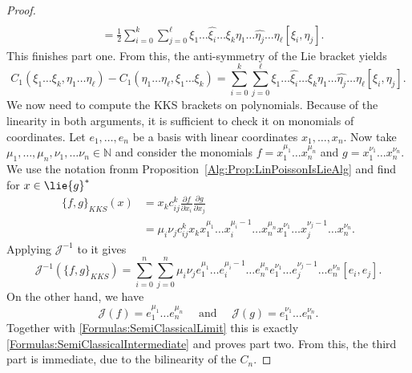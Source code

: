 \begin{proof}
\begin{align*}
		[\xi_{\sigma(k)}, \eta_{\tau(\ell)}]
		\\
		& =
		\frac{1}{2}
		\sum\limits_{i = 0}^k
		\sum\limits_{j = 0}^{\ell}
		\xi_1 \ldots \widehat{\xi_i} \ldots \xi_k
		\eta_1 \ldots \widehat{\eta_j} \ldots \eta_{\ell}
		[\xi_i, \eta_j].
	\end{align*}
	This finishes part one. From this, the anti-symmetry of the Lie bracket 
	yields
	\begin{equation*}
		C_1 
		\left(
			\xi_1 \ldots \xi_k, \eta_1 \ldots \eta_{\ell}
		\right)
		-
		C_1 
		\left(
			\eta_1 \ldots \eta_{\ell}, \xi_1 \ldots \xi_k
		\right)
		=
		\sum\limits_{i = 0}^k
		\sum\limits_{j = 0}^{\ell}
		\xi_1 \ldots \widehat{\xi_i} \ldots \xi_k
		\eta_1 \ldots \widehat{\eta_j} \ldots \eta_{\ell}
		[\xi_i, \eta_j].
	\end{equation*}
	We now need to compute the KKS brackets on polynomials. Because of the 
	linearity in both arguments, it is sufficient to check it on monomials of 
	coordinates. Let $e_1, \ldots, e_n$ be a basis with linear coordinates 
	$x_1, \ldots, x_n$. Now take $\mu_1, \ldots, \mu_n, \nu_1, \ldots \nu_n 
	\in \mathbb{N}$ and 	consider the monomials $f = x_1^{\mu_1} \ldots 
	x_n^{\mu_n}$ and $g = x_1^{\nu_1} \ldots x_n^{\nu_n}$. We use the 
	notation fronm Proposition~\ref{Alg:Prop:LinPoissonIsLieAlg} and find
	for $x \in \lie{g}^*$
	\begin{align*}
		\{ f, g \}_{KKS}(x)
		& =
		x_k c_{ij}^k
		\frac{\partial f}{\partial x_i}
		\frac{\partial g}{\partial x_j}
		\\
		& =
		\mu_i \nu_j c_{ij}^k
		x_k 
		x_1^{\mu_1} \ldots x_i^{\mu_i - 1} \ldots x_n^{\mu_n}
		x_1^{\nu_1} \ldots x_j^{\nu_j - 1} \ldots x_n^{\nu_n}.
	\end{align*}
	Applying $\mathcal{J}^{-1}$ to it gives
	\begin{equation}
		\label{Formulas:SemiClassicalIntermediate}
		\mathcal{J}^{-1}
		\left(
			\{ f, g \}_{KKS}
		\right)
		=
		\sum\limits_{i=0}^n
		\sum\limits_{j=0}^n
		\mu_i \nu_j
		e_1^{\mu_1} \ldots e_i^{\mu_i - 1} \ldots e_n^{\mu_n}
		e_1^{\nu_1} \ldots e_j^{\nu_j - 1} \ldots e_n^{\nu_n}
		[e_i, e_j].
	\end{equation}
	On the other hand, we have
	\begin{equation*}
		\mathcal{J}(f)
		=
		e_1^{\mu_1} \ldots e_n^{\mu_n}
		\quad \text{ and } \quad
		\mathcal{J}(g)
		=
		e_1^{\nu_1} \ldots e_n^{\nu_n}.
	\end{equation*}
	Together with \eqref{Formulas:SemiClassicalLimit} this is exactly 
	\eqref{Formulas:SemiClassicalIntermediate} and proves part two.
	From this, the third part is immediate, due to the bilinearity of 
	the $C_n$.
\end{proof}
